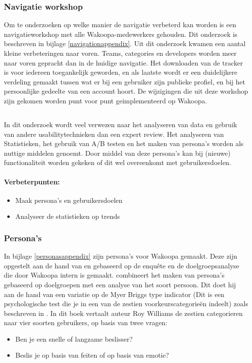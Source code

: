 \documentclass[a4paper, 10pt, pdftex]{report}
\begin{document}
    \subsubsection{Navigatie workshop}
      Om te onderzoeken op welke manier de navigatie verbeterd kan worden is een navigatieworkshop met alle Wakoopa-medewerkers gehouden. Dit onderzoek is beschreven in bijlage \ref{navigationappendix}. Uit dit onderzoek kwamen een aantal kleine verbeteringen naar voren. Teams, categories en developers worden meer naar voren gepracht dan in de huidige navigatie. Het downloaden van de tracker is voor iedereen toegankelijk geworden, en als laatste wordt er een duidelijkere verdeling gemaakt tussen wat er bij een gebruiker zijn publieke profiel, en bij het persoonlijke gedeelte van een account hoort. De wijzigingen die uit deze workshop zijn gekomen worden punt voor punt geimplementeerd op Wakoopa.

    \subsection{\cite{Timmerman2008}}
    In dit onderzoek wordt veel verwezen naar het analyseren van data en gebruik van andere usabilitytechnieken dan een expert review. Het analyseren van Statistieken, het gebruik van A/B testen en het maken van persona's worden als nuttige middelen genoemt. Door middel van deze persona's kan bij (nieuwe) functionaliteit worden gekeken of dit wel overeenkomt met gebruikersdoelen.

    \paragraph{\textbf{Verbeterpunten:}}
      \begin{itemize}
        \item Maak persona's en gebruikersdoelen
        \item Analyseer de statistieken op trends
      \end{itemize}

    \subsubsection{Persona's}
      In bijlage \ref{personasappendix} zijn persona's voor Wakoopa gemaakt. Deze zijn opgestelt aan de hand van \cite{Klompsma} en gebaseerd op de enqu\^ete en de doelgroepsanalyse die door Wakoopa intern is gemaakt. \cite{Klompsma} combineert het maken van persona's gebaseerd op doelgroepen met een analyse van het soort persoon. Dit doet hij aan de hand van een variatie op de Myer Briggs type indicator (Dit is een psychologische test die je in een van de zestien voorkeurscategorie\"en indeelt) zoals beschreven in \cite{Williams}. In dit boek vertaalt auteur Roy Williams de zestien categorieren naar vier soorten gebruikers, op basis van twee vragen:
      \begin{itemize}
        \item Ben je een snelle of langzame beslisser?
        \item Beslis je op basis van feiten of op basis van emotie?
      \end{itemize}
\end{document}
